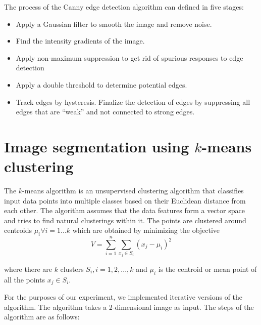 	The process of the Canny edge detection algorithm can defined in five
	stages:
	
	\begin{itemize}
		\item Apply a Gaussian filter to smooth the image and remove noise.
		\item Find the intensity gradients of the image.
		\item Apply non-maximum suppression to get rid of spurious
		responses to edge detection
		\item Apply a double threshold to determine potential edges.
		\item Track edges by hysteresis. Finalize the detection of
		edges by suppressing all edges that are ``weak'' and not
		connected to strong edges.
		\end{itemize}
		
		\section{Image segmentation using $k$-means clustering}
		The $k$-means algorithm is an unsupervised clustering algorithm that
		classifies input data points into multiple classes based on their
		Euclidean distance from each other. The algorithm assumes that the
		data features form a vector space and tries to find natural
		clusterings within it. The points are clustered around
		centroids \begin{math}\mu_{i} \forall i = 1...k\end{math} which are
		obtained by minimizing the objective
		\begin{equation}
		V = \sum\limits_{i=1}^n \sum\limits_{x_{j}\in S_{i}} (x_{j} - \mu_{i})^2
		\end{equation}
		
		where there are \begin{math}k\end{math} clusters \begin{math}
			S_{i},i=1,2,...,k \end{math} and \begin{math} \mu_{i} \end{math}
			is the centroid or mean point of all the points \begin{math}x_{j}
				\in S_{i}\end{math}.
				
				For the purposes of our experiment, we implemented iterative versions
				of the algorithm. The algorithm takes a 2-dimensional image as
				input. The steps of the algorithm are as follows:
				
